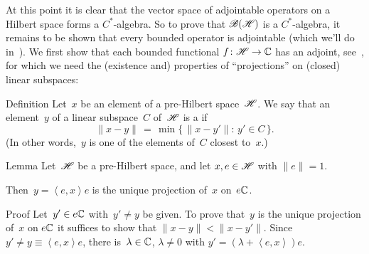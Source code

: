 \documentclass[a]{subfiles}
\begin{document}
\begin{parsec}%
\begin{point}%
At this point
it is clear that the vector space of adjointable operators
on a Hilbert space forms a $C^*$-algebra.
So to prove that $\mathscr{B}(\mathscr{H})$
is a $C^*$-algebra,
it remains to be shown that every bounded operator
is adjointable (which we'll do in~).
We first show that each bounded functional $f\colon \mathscr{H}\to \mathbb{C}$
has an adjoint, see~,
for which we need the (existence and) properties of ``projections''
on (closed) linear subspaces:
\end{point}
\begin{point}{Definition}
Let~$x$ be an element of a pre-Hilbert space~$\mathscr{H}$.
We say that an element~$y$ of a linear subspace~$C$
of~$\mathscr{H}$ is a 
if
\begin{equation*}
\|x-y\|\,=\,\min\{\,\|x-y'\|\colon \,y'\in C\,\}.
\end{equation*}
(In other words,~$y$ is one of the elements of~$C$ closest to~$x$.)
\end{point}
\begin{point}{Lemma}%
Let~$\mathscr{H}$ be a pre-Hilbert space,
and let $x,e\in\mathscr{H}$ with
$\|e\|=1$.

Then~$y=\left<e,x\right>e$ is the unique projection of~$x$ on~$e\mathbb{C}$.
\begin{point}{Proof}%
Let~$y'\in e\mathbb{C}$
with~$y'\neq y$
be given.
To prove that~$y$
is the unique projection of~$x$ on $e\mathbb{C}$
it suffices to show that $\|x-y\|<\|x-y'\|$.
Since~$y'\neq y\equiv \left<e,x\right>e$,
there is~$\lambda\in \mathbb{C}$, $\lambda\neq 0$ 
with $y'=(\lambda+\left<e,x\right>)e$.


\end{point}
\end{point}
\end{parsec}
\end{document}
